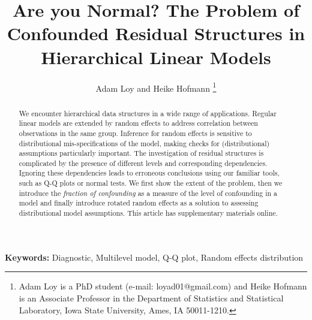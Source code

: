 \documentclass[12pt]{article} %
\begin{document}
\title{Are you Normal? The Problem of Confounded Residual Structures in Hierarchical Linear Models}
\author{{Adam Loy and Heike Hofmann}
\thanks{Adam Loy is a PhD student (e-mail: loyad01@gmail.com) and Heike Hofmann is an Associate Professor in the Department of Statistics and Statistical Laboratory, Iowa State University, Ames, IA 50011-1210.}}

\maketitle


\begin{abstract}
We encounter hierarchical data structures in a wide range of applications. Regular linear models are extended by random effects to address correlation between observations in the same group. Inference for random effects is sensitive to  distributional mis-specifications of the model, making checks for (distributional) assumptions particularly important.  The investigation of residual structures is complicated by the presence of  different levels and corresponding  dependencies. Ignoring these dependencies leads to  erroneous conclusions using our familiar tools, such as Q-Q plots or normal tests. We first show the extent of the problem, then we introduce the {\it fraction of confounding} as a measure of the level of confounding in a model and finally introduce rotated random effects as a solution to assessing distributional model assumptions. This article has supplementary materials online.
\end{abstract}
{\bf Keywords:} Diagnostic, Multilevel model, Q-Q plot, Random effects distribution


\end{document}
